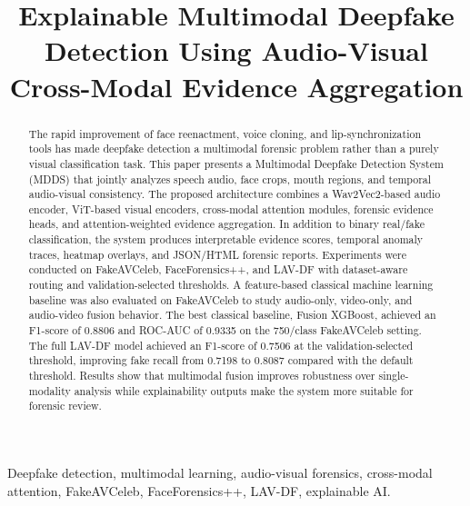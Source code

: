\documentclass[conference]{IEEEtran}
\begin{document}
\title{Explainable Multimodal Deepfake Detection Using Audio-Visual Cross-Modal Evidence Aggregation}

\author{
}

\maketitle

\begin{abstract}
The rapid improvement of face reenactment, voice cloning, and lip-synchronization tools has made deepfake detection a multimodal forensic problem rather than a purely visual classification task. This paper presents a Multimodal Deepfake Detection System (MDDS) that jointly analyzes speech audio, face crops, mouth regions, and temporal audio-visual consistency. The proposed architecture combines a Wav2Vec2-based audio encoder, ViT-based visual encoders, cross-modal attention modules, forensic evidence heads, and attention-weighted evidence aggregation. In addition to binary real/fake classification, the system produces interpretable evidence scores, temporal anomaly traces, heatmap overlays, and JSON/HTML forensic reports. Experiments were conducted on FakeAVCeleb, FaceForensics++, and LAV-DF with dataset-aware routing and validation-selected thresholds. A feature-based classical machine learning baseline was also evaluated on FakeAVCeleb to study audio-only, video-only, and audio-video fusion behavior. The best classical baseline, Fusion XGBoost, achieved an F1-score of 0.8806 and ROC-AUC of 0.9335 on the 750/class FakeAVCeleb setting. The full LAV-DF model achieved an F1-score of 0.7506 at the validation-selected threshold, improving fake recall from 0.7198 to 0.8087 compared with the default threshold. Results show that multimodal fusion improves robustness over single-modality analysis while explainability outputs make the system more suitable for forensic review.
\end{abstract}

\begin{IEEEkeywords}
Deepfake detection, multimodal learning, audio-visual forensics, cross-modal attention, FakeAVCeleb, FaceForensics++, LAV-DF, explainable AI.
\end{IEEEkeywords}
\end{document}
